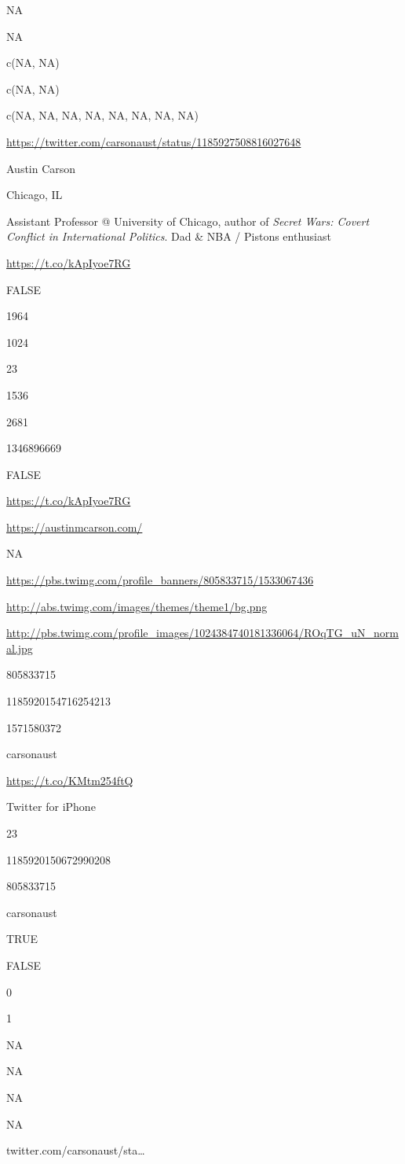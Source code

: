 \documentclass[]{book}
\begin{document}
NA

NA

c(NA, NA)

c(NA, NA)

c(NA, NA, NA, NA, NA, NA, NA, NA)

\url{https://twitter.com/carsonaust/status/1185927508816027648}

Austin Carson

Chicago, IL

Assistant Professor @ University of Chicago, author of \emph{Secret Wars: Covert Conflict in International Politics}. Dad \& NBA / Pistons enthusiast

\url{https://t.co/kApIyoe7RG}

FALSE

1964

1024

23

1536

2681

1346896669

FALSE

\url{https://t.co/kApIyoe7RG}

\url{https://austinmcarson.com/}

NA

\url{https://pbs.twimg.com/profile_banners/805833715/1533067436}

\url{http://abs.twimg.com/images/themes/theme1/bg.png}

\url{http://pbs.twimg.com/profile_images/1024384740181336064/ROqTG_uN_normal.jpg}

805833715

1185920154716254213

1571580372

carsonaust

\url{https://t.co/KMtm254ftQ}

Twitter for iPhone

23

1185920150672990208

805833715

carsonaust

TRUE

FALSE

0

1

NA

NA

NA

NA

twitter.com/carsonaust/sta\ldots{}
\end{document}

